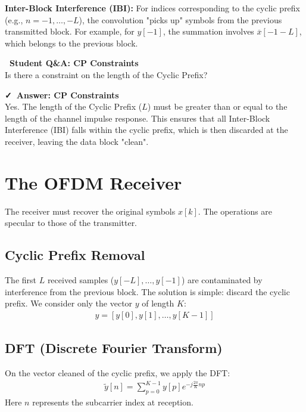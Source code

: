 \documentclass[a4paper, 12pt]{book}
\begin{document}
\textbf{Inter-Block Interference (IBI):}
For indices corresponding to the cyclic prefix (e.g., $n = -1, \dots, -L$), the convolution "picks up" symbols from the previous transmitted block. For example, for $y[-1]$, the summation involves $\overline{x}[-1-L]$, which belongs to the previous block.

\noindent\colorbox{yellow!25}{
    \parbox{\dimexpr\linewidth-2\fboxsep}{
        \textbf{\faQuestionCircle\ Student Q\&A: CP Constraints} \\
        \small
        Is there a constraint on the length of the Cyclic Prefix? \\
    }
}

\vspace{0.5em} %

\noindent\colorbox{green!15}{
    \parbox{\dimexpr\linewidth-2\fboxsep}{
        \textbf{\faCheck\ Answer: CP Constraints} \\
        \small
        Yes. The length of the Cyclic Prefix ($L$) must be greater than or equal to the length of the channel impulse response. This ensures that all Inter-Block Interference (IBI) falls within the cyclic prefix, which is then discarded at the receiver, leaving the data block "clean".
    }
}

\section{The OFDM Receiver}

The receiver must recover the original symbols $x[k]$. The operations are specular to those of the transmitter.

\subsection{Cyclic Prefix Removal}
The first $L$ received samples ($y[-L], \dots, y[-1]$) are contaminated by interference from the previous block. The solution is simple: discard the cyclic prefix.
We consider only the vector $y$ of length $K$:
\begin{align}
y = [y[0], y[1], \dots, y[K-1]]
\end{align}

\subsection{DFT (Discrete Fourier Transform)}
On the vector cleaned of the cyclic prefix, we apply the DFT:
\begin{align}
\tilde{y}[n] = \sum_{p=0}^{K-1} y[p] e^{-j \frac{2\pi}{K} np}
\end{align}
Here $n$ represents the subcarrier index at reception.
\end{document}
